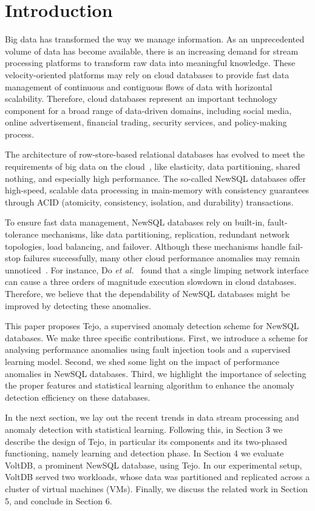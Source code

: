 \section{Introduction}

Big data has transformed the way we manage information. As an unprecedented volume of data has become available, there is an increasing demand for stream processing platforms to transform raw data into meaningful knowledge. These velocity-oriented platforms may rely on cloud databases to provide fast data management of continuous and contiguous flows of data with horizontal scalability. Therefore, cloud databases represent an important technology component for a broad range of data-driven domains, including social media, online advertisement, financial trading, security services, and policy-making process.

The architecture of row-store-based relational databases has evolved to meet the requirements of big data on the cloud~\cite{ren2012lightweight}, like elasticity, data partitioning, shared nothing, and especially high performance. The so-called NewSQL databases offer high-speed, scalable data processing in main-memory with consistency guarantees through ACID (atomicity, consistency, isolation, and durability) transactions.

To ensure fast data management, NewSQL databases rely on built-in, fault-tolerance mechanisms, like data partitioning, replication, redundant network topologies, load balancing, and failover. Although these mechanisms handle fail-stop failures successfully, many other cloud performance anomalies may remain unnoticed~\cite{server_delays}. For instance, Do \emph{et al.}~\cite{do2013limplock} found that a single limping network interface can cause a three orders of magnitude execution slowdown in cloud databases. Therefore, we believe that the dependability of NewSQL databases might be improved by detecting these anomalies. 

This paper proposes Tejo, a supervised anomaly detection scheme for NewSQL databases. We make three specific contributions. First, we introduce a scheme for analysing performance anomalies using fault injection tools and a supervised learning model. Second, we shed some light on the impact of performance anomalies in NewSQL databases. Third, we highlight the importance of selecting the proper features and statistical learning algorithm to enhance the anomaly detection efficiency on these databases.

In the next section, we lay out the recent trends in data stream processing and anomaly detection with statistical learning. Following this, in Section 3 we describe the design of Tejo, in particular its components and its two-phased functioning, namely learning and detection phase. In Section 4 we evaluate VoltDB, a prominent NewSQL database, using Tejo. In our experimental setup, VoltDB served two workloads, whose data was partitioned and replicated across a cluster of virtual machines (VMs). Finally, we discuss the related work in Section 5, and conclude in Section 6.


